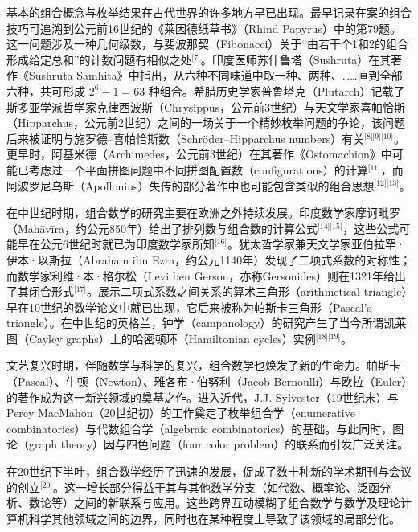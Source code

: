 基本的组合概念与枚举结果在古代世界的许多地方早已出现。最早记录在案的组合技巧可追溯到公元前16世纪的《莱因德纸草书》（Rhind Papyrus）中的第79题。这一问题涉及一种几何级数，与斐波那契（Fibonacci）关于“由若干个1和2的组合形成给定总和”的计数问题有相似之处\(^\text{[7]}\)。印度医师苏什鲁塔（Sushruta）在其著作《Sushruta Samhita》中指出，从六种不同味道中取一种、两种、……直到全部六种，共可形成 $2^{6}-1=63$ 种组合。希腊历史学家普鲁塔克（Plutarch）记载了斯多亚学派哲学家克律西波斯（Chrysippus，公元前3世纪）与天文学家喜帕恰斯（Hipparchus，公元前2世纪）之间的一场关于一个精妙枚举问题的争论，该问题后来被证明与施罗德–喜帕恰斯数（Schröder–Hipparchus numbers）有关\(^\text{[8][9][10]}\)。更早时，阿基米德（Archimedes，公元前3世纪）在其著作《Ostomachion》中可能已考虑过一个平面拼图问题中不同拼图配置数（configurations）的计算\(^\text{[11]}\)，而阿波罗尼乌斯（Apollonius）失传的部分著作中也可能包含类似的组合思想\(^\text{[12][13]}\)。

在中世纪时期，组合数学的研究主要在欧洲之外持续发展。印度数学家摩诃毗罗（Mahāvīra，约公元850年）给出了排列数与组合数的计算公式\(^\text{[14][15]}\)，这些公式可能早在公元6世纪时就已为印度数学家所知\(^\text{[16]}\)。犹太哲学家兼天文学家亚伯拉罕·伊本·以斯拉（Abraham ibn Ezra，约公元1140年）发现了二项式系数的对称性；而数学家利维·本·格尔松（Levi ben Gerson，亦称Gersonides）则在1321年给出了其闭合形式\(^\text{[17]}\)。展示二项式系数之间关系的算术三角形（arithmetical triangle）早在10世纪的数学论文中就已出现，它后来被称为帕斯卡三角形（Pascal’s triangle）。在中世纪的英格兰，钟学（campanology）的研究产生了当今所谓凯莱图（Cayley graphs）上的哈密顿环（Hamiltonian cycles）实例\(^\text{[18][19]}\)。

文艺复兴时期，伴随数学与科学的复兴，组合数学也焕发了新的生命力。帕斯卡（Pascal）、牛顿（Newton）、雅各布·伯努利（Jacob Bernoulli）与欧拉（Euler）的著作成为这一新兴领域的奠基之作。进入近代，J.J. Sylvester（19世纪末）与 Percy MacMahon（20世纪初）的工作奠定了枚举组合学（enumerative combinatorics）与代数组合学（algebraic combinatorics）的基础。与此同时，图论（graph theory）因与四色问题（four color problem）的联系而引发广泛关注。

在20世纪下半叶，组合数学经历了迅速的发展，促成了数十种新的学术期刊与会议的创立\(^\text{[20]}\)。这一增长部分得益于其与其他数学分支（如代数、概率论、泛函分析、数论等）之间的新联系与应用。这些跨界互动模糊了组合数学与数学及理论计算机科学其他领域之间的边界，同时也在某种程度上导致了该领域的局部分化。

